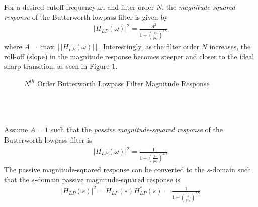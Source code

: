 \documentclass{report}
\begin{document}
\noindent For a desired cutoff frequency $\omega_c$ and filter order $N$, the \emph{magnitude-squared response} of the Butterworth lowpass filter is given by 
\begin{align}
    |H_{LP}(\omega)|^2 = \frac{A^2}{1+\left(\frac{j\omega}{j\omega_c}\right)^{2N}}
\end{align}
where $A=\max[|H_{LP}(\omega)|]$. Interestingly, as the filter order $N$ increases, the roll-off (slope) in the magnitude response 
becomes steeper and closer to the ideal sharp transition, as seen in Figure \ref{butt_resp}.
\begin{figure}[!hbt]
    \centering
    \caption{$N^{th}$ Order Butterworth Lowpass Filter Magnitude Response}
    \label{butt_resp}
\end{figure}
\\ \\ \\
Assume $A=1$ such that the \emph{passive magnitude-squared response} of the Butterworth lowpass filter is 
\begin{align}
    |H_{LP}(\omega)|^2 = \frac{1}{1+\left(\frac{j\omega}{j\omega_c}\right)^{2N}}
\end{align}
The passive magnitude-squared response can be converted to the $s$-domain such that 
the $s$-domain passive magnitude-squared response is
\begin{align}
    |H_{LP}(s)|^2 = H_{LP}(s)H_{LP}^*(s) = \frac{1}{1+\left(\frac{s}{j\omega_c}\right)^{2N}}
\end{align}
\end{document}

